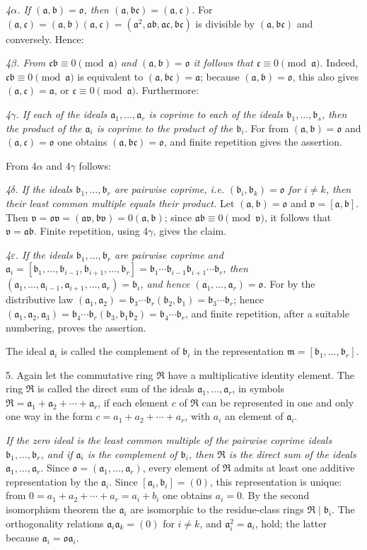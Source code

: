\documentclass[11pt]{article}
\providecommand{\mR}{\mathfrak{R}}
\providecommand{\ma}{\mathfrak{a}}
\providecommand{\mb}{\mathfrak{b}}
\providecommand{\mc}{\mathfrak{c}}
\providecommand{\mm}{\mathfrak{m}}
\providecommand{\mo}{\mathfrak{o}}
\providecommand{\mv}{\mathfrak{v}}
\begin{document}
\emph{4$\alpha$. If $(\ma,\mb)=\mo$, then $(\ma,\mb\mc)=(\ma,\mc)$.} For $(\ma,\mc)=(\ma,\mb)(\ma,\mc)=(\ma^2,\ma\mb,\ma\mc,\mb\mc)$ is divisible by $(\ma,\mb\mc)$ and conversely. Hence:

\emph{4$\beta$. From $\mc\mb\equiv0\pmod{\ma}$ and $(\ma,\mb)=\mo$ it follows that $\mc\equiv0\pmod{\ma}$.} Indeed, $\mc\mb\equiv0\pmod{\ma}$ is equivalent to $(\ma,\mb\mc)=\ma$; because $(\ma,\mb)=\mo$, this also gives $(\ma,\mc)=\ma$, or $\mc\equiv0\pmod{\ma}$. Furthermore:

\emph{4$\gamma$. If each of the ideals $\ma_1,
\ldots,\ma_r$ is coprime to each of the ideals $\mb_1,\ldots,\mb_s$, then the product of the $\ma_i$ is coprime to the product of the $\mb_i$.} For from $(\ma,\mb)=\mo$ and $(\ma,\mc)=\mo$ one obtains $(\ma,\mb\mc)=\mo$, and finite repetition gives the assertion.

From 4$\alpha$ and 4$\gamma$ follows:

\emph{4$\delta$. If the ideals $\mb_1,
\ldots,\mb_r$ are pairwise coprime, i.e. $(\mb_i,\mb_k)=\mo$ for $i\ne k$, then their least common multiple equals their product.} Let $(\ma,\mb)=\mo$ and $\mv=[\ma,\mb]$. Then $\mv=\mo\mv=(\ma\mv,\mb\mv)=0(\ma,\mb)$; since $\ma\mb\equiv0\pmod{\mv}$, it follows that $\mv=\ma\mb$. Finite repetition, using 4$\gamma$, gives the claim.

\emph{4$\varepsilon$. If the ideals $\mb_1,
\ldots,\mb_r$ are pairwise coprime and $\ma_i=[\mb_1,
\ldots,\mb_{i-1},\mb_{i+1},\ldots,\mb_r]=\mb_1\cdots\mb_{i-1}\mb_{i+1}\cdots\mb_r$, then $(\ma_1,
\ldots,\ma_{i-1},\ma_{i+1},\ldots,\ma_r)=\mb_i$, and hence $(\ma_1,
\ldots,\ma_r)=\mo$.} For by the distributive law $(\ma_1,\ma_2)=\mb_3\cdots\mb_r(\mb_2,\mb_1)=\mb_3\cdots\mb_r$; hence $(\ma_1,\ma_2,\ma_3)=\mb_4\cdots\mb_r(\mb_3,\mb_1\mb_2)=\mb_4\cdots\mb_r$, and finite repetition, after a suitable numbering, proves the assertion.

The ideal $\ma_i$ is called the complement of $\mb_i$ in the representation $\mm=[\mb_1,
\ldots,\mb_r]$.

5. Again let the commutative ring $\mR$ have a multiplicative identity element. The ring $\mR$ is called the direct sum of the ideals $\ma_1,
\ldots,\ma_r$, in symbols $\mR=\ma_1+\ma_2+\cdots+\ma_r$, if each element $c$ of $\mR$ can be represented in one and only one way in the form $c=a_1+a_2+\cdots+a_r$, with $a_i$ an element of $\ma_i$.

\emph{If the zero ideal is the least common multiple of the pairwise coprime ideals $\mb_1,
\ldots,\mb_r$, and if $\ma_i$ is the complement of $\mb_i$, then $\mR$ is the direct sum of the ideals $\ma_1,
\ldots,\ma_r$.} Since $\mo=(\ma_1,
\ldots,\ma_r)$, every element of $\mR$ admits at least one additive representation by the $\ma_i$. Since $[\ma_i,\mb_i]=(0)$, this representation is unique: from $0=a_1+a_2+\cdots+a_r=a_i+b_i$ one obtains $a_i=0$. By the second isomorphism theorem the $\ma_i$ are isomorphic to the residue-class rings $\mR\mid\mb_i$. The orthogonality relations $\ma_i\ma_k=(0)$ for $i\ne k$, and $\ma_i^2=\ma_i$, hold; the latter because $\ma_i=\mo\ma_i$.
\end{document}
